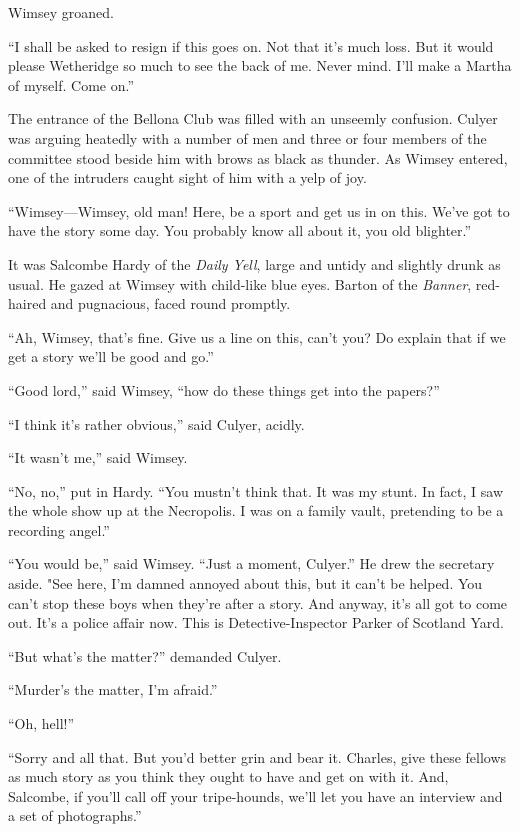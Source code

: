 Wimsey groaned.

\enquote{I shall be asked to resign if this goes on. Not that it's much loss. But it would please Wetheridge so much to see the back of me. Never mind. I'll make a Martha of myself. Come on.}

The entrance of the Bellona Club was filled with an unseemly confusion. Culyer was arguing heatedly with a number of men and three or four members of the committee stood beside him with brows as black as thunder. As Wimsey entered, one of the intruders caught sight of him with a yelp of joy.

\enquote{Wimsey\allowbreak---\allowbreak Wimsey, old man! Here, be a sport and get us in on this. We've got to have the story some day. You probably know all about it, you old blighter.}

It was Salcombe Hardy of the \textit{Daily Yell}, large and untidy and slightly drunk as usual. He gazed at Wimsey with child-like blue eyes. Barton of the \textit{Banner}, red-haired and pugnacious, faced round promptly.

\enquote{Ah, Wimsey, that's fine. Give us a line on this, can't you? Do explain that if we get a story we'll be good and go.}

\enquote{Good lord,} said Wimsey, \enquote{how do these things get into the papers?}

\enquote{I think it's rather obvious,} said Culyer, acidly.

\enquote{It wasn't me,} said Wimsey.

\enquote{No, no,} put in Hardy. \enquote{You mustn't think that. It was my stunt. In fact, I saw the whole show up at the Necropolis. I was on a family vault, pretending to be a recording angel.}

\enquote{You would be,} said Wimsey. \enquote{Just a moment, Culyer.} He drew the secretary aside. "See here, I'm damned annoyed about this, but it can't be helped. You can't stop these boys when they're after a story. And anyway, it's all got to come out. It's a police affair now. This is Detective-Inspector Parker of Scotland Yard.

\enquote{But what's the matter?} demanded Culyer.

\enquote{Murder's the matter, I'm afraid.}

\enquote{Oh, hell!}

\enquote{Sorry and all that. But you'd better grin and bear it. Charles, give these fellows as much story as you think they ought to have and get on with it. And, Salcombe, if you'll call off your tripe-hounds, we'll let you have an interview and a set of photographs.}


